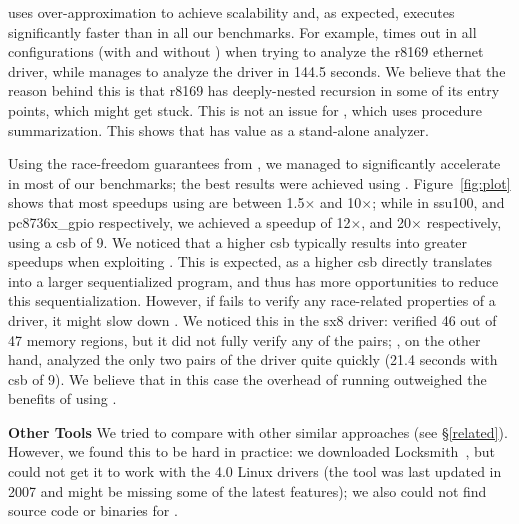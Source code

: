 \whoop uses over-approximation to achieve scalability and, as expected, executes significantly faster than \corral in all our benchmarks. For example, \corral times out in all configurations (with and without \whoop) when trying to analyze the r8169 ethernet driver, while \whoop manages to analyze the driver in 144.5 seconds. We believe that the reason behind this is that r8169 has deeply-nested recursion in some of its entry points, which might get \corral stuck. This is not an issue for \whoop, which uses procedure summarization. This shows that \whoop has value as a stand-alone analyzer.

Using the race-freedom guarantees from \whoop, we managed to significantly accelerate \corral in most of our benchmarks; the best results were achieved using \yieldmr. Figure~\ref{fig:plot} shows that most speedups using \yieldmr are between 1.5$\times$ and 10$\times$; while in ssu100, and pc8736x\_gpio respectively, we achieved a speedup of 12$\times$, and 20$\times$ respectively, using a csb of 9. We noticed that a higher csb typically results into greater speedups when exploiting \whoop. This is expected, as a higher csb directly translates into a larger sequentialized program, and thus \whoop has more opportunities to reduce this sequentialization.
%
However, if \whoop fails to verify any race-related properties of a driver, it might slow down \corral. We noticed this in the sx8 driver: \whoop verified 46 out of 47 memory regions, but it did not fully verify any of the pairs; \corral, on the other hand, analyzed the only two pairs of the driver quite quickly (21.4 seconds with csb of 9). We believe that in this case the overhead of running \whoop outweighed the benefits of using \yieldmr.

\noindent\textbf{Other Tools }
%
We tried to compare \whoop with other similar approaches (see \S\ref{related}). However, we found this to be hard in practice: we downloaded Locksmith~\cite{pratikakis2006locksmith}, but could not get it to work with the 4.0 Linux drivers (the tool was last updated in 2007 and might be missing some of the latest features); we also could not find source code or binaries for \cite{kahlon2007fast, kahlon2009semantic, das2015section}.
